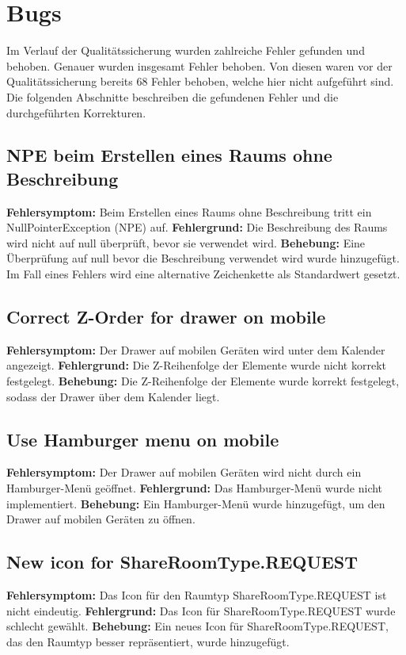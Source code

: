 
\chapter{Bugs}
\label{ch:bugs}

Im Verlauf der Qualitätssicherung wurden zahlreiche Fehler gefunden und behoben.
Genauer wurden insgesamt  Fehler behoben.
Von diesen waren vor der Qualitätssicherung bereits 68 Fehler behoben, welche hier nicht aufgeführt sind.
Die folgenden Abschnitte beschreiben die gefundenen Fehler und die durchgeführten Korrekturen.

\section{NPE beim Erstellen eines Raums ohne Beschreibung}
\textbf{Fehlersymptom:} Beim Erstellen eines Raums ohne Beschreibung tritt ein NullPointerException (NPE) auf.
\textbf{Fehlergrund:} Die Beschreibung des Raums wird nicht auf null überprüft, bevor sie verwendet wird.
\textbf{Behebung:} Eine Überprüfung auf null bevor die Beschreibung verwendet wird wurde hinzugefügt. Im Fall eines Fehlers wird eine alternative Zeichenkette als Standardwert gesetzt.

\section{Correct Z-Order for drawer on mobile}
\textbf{Fehlersymptom:} Der Drawer auf mobilen Geräten wird unter dem Kalender angezeigt.
\textbf{Fehlergrund:} Die Z-Reihenfolge der Elemente wurde nicht korrekt festgelegt.
\textbf{Behebung:} Die Z-Reihenfolge der Elemente wurde korrekt festgelegt, sodass der Drawer über dem Kalender liegt.

\section{Use Hamburger menu on mobile}
\textbf{Fehlersymptom:} Der Drawer auf mobilen Geräten wird nicht durch ein Hamburger-Menü geöffnet.
\textbf{Fehlergrund:} Das Hamburger-Menü wurde nicht implementiert.
\textbf{Behebung:} Ein Hamburger-Menü wurde hinzugefügt, um den Drawer auf mobilen Geräten zu öffnen.

\section{New icon for ShareRoomType.REQUEST}
\textbf{Fehlersymptom:} Das Icon für den Raumtyp ShareRoomType.REQUEST ist nicht eindeutig.
\textbf{Fehlergrund:} Das Icon für ShareRoomType.REQUEST wurde schlecht gewählt.
\textbf{Behebung:} Ein neues Icon für ShareRoomType.REQUEST, das den Raumtyp besser repräsentiert, wurde hinzugefügt.

